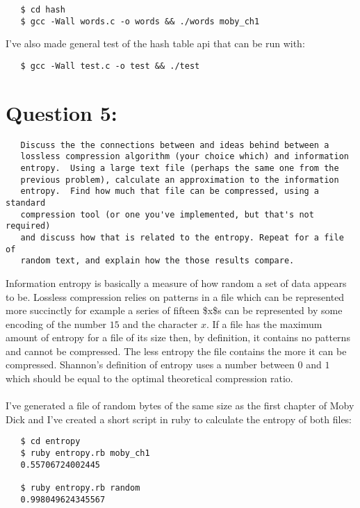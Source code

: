 \documentclass[11pt]{article}
\begin{document}
\begin{verbatim}
   $ cd hash
   $ gcc -Wall words.c -o words && ./words moby_ch1
\end{verbatim}

  
  \noindent
  I've also made general test of the hash table api that can be run
  with:
  
\begin{verbatim}
   $ gcc -Wall test.c -o test && ./test
\end{verbatim}


\section*{Question 5:}
\label{sec-5}

  
\begin{verbatim}
   Discuss the the connections between and ideas behind between a
   lossless compression algorithm (your choice which) and information
   entropy.  Using a large text file (perhaps the same one from the
   previous problem), calculate an approximation to the information
   entropy.  Find how much that file can be compressed, using a standard
   compression tool (or one you've implemented, but that's not required)
   and discuss how that is related to the entropy. Repeat for a file of
   random text, and explain how the those results compare.
\end{verbatim}

  
  \noindent
  Information entropy is basically a measure of how random a set of
  data appears to be.  Lossless compression relies on patterns in a
  file which can be represented more succinctly for example a series
  of fifteen \$x\$s can be represented by some encoding of the number
  $15$ and the character $x$.  If a file has the maximum amount of
  entropy for a file of its size then, by definition, it contains no
  patterns and cannot be compressed.  The less entropy the file
  contains the more it can be compressed.  Shannon's definition of
  entropy uses a number between $0$ and $1$ which should be equal to
  the optimal theoretical compression ratio. \\
  \\
  \noindent
  I've generated a file of random bytes of the same size as the first
  chapter of Moby Dick and I've created a short script in ruby to
  calculate the entropy of both files:
  
\begin{verbatim}
   $ cd entropy
   $ ruby entropy.rb moby_ch1
   0.55706724002445
   
   $ ruby entropy.rb random
   0.998049624345567
\end{verbatim}
\end{document}
